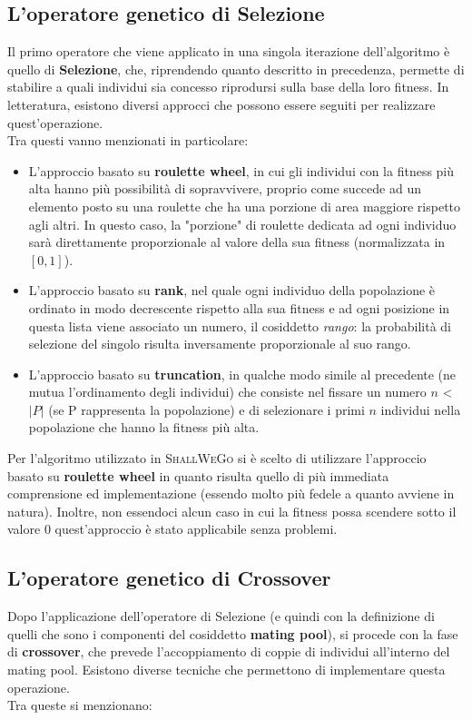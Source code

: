     \subsection{L'operatore genetico di Selezione}
        Il primo operatore che viene applicato in una singola iterazione dell'algoritmo è quello di \textbf{Selezione}, che, riprendendo quanto descritto in precedenza, permette di stabilire a quali individui sia concesso riprodursi sulla base della loro fitness. In letteratura, esistono diversi approcci che possono essere seguiti per realizzare quest'operazione. \\
        Tra questi vanno menzionati in particolare:

        \begin{itemize}
            \item L'approccio basato su \textbf{roulette wheel}, in cui gli individui con la fitness più alta hanno più possibilità di sopravvivere, proprio come succede ad un elemento posto su una roulette che ha una porzione di area maggiore rispetto agli altri. In questo caso, la "porzione" di roulette dedicata ad ogni individuo sarà direttamente proporzionale al valore della sua fitness (normalizzata in $[0, 1]$).
            \item L'approccio basato su \textbf{rank}, nel quale ogni individuo della popolazione è ordinato in modo decrescente rispetto alla sua fitness e ad ogni posizione in questa lista viene associato un numero, il cosiddetto \textit{rango}: la probabilità di selezione del singolo risulta inversamente proporzionale al suo rango.
            \item L'approccio basato su \textbf{truncation}, in qualche modo simile al precedente (ne mutua l'ordinamento degli individui) che consiste nel fissare un numero $n$ < $|P|$ (se P rappresenta la popolazione) e di selezionare i primi $n$ individui nella popolazione che hanno la fitness più alta.
        \end{itemize}

        Per l'algoritmo utilizzato in \textsc{ShallWeGo} si è scelto di utilizzare l'approccio basato su \textbf{roulette wheel} in quanto risulta quello di più immediata comprensione ed implementazione (essendo molto più fedele a quanto avviene in natura). Inoltre, non essendoci alcun caso in cui la fitness possa scendere sotto il valore $0$ quest'approccio è stato applicabile senza problemi.

    \subsection{L'operatore genetico di Crossover}
        Dopo l'applicazione dell'operatore di Selezione (e quindi con la definizione di quelli che sono i componenti del cosiddetto \textbf{mating pool}), si procede con la fase di \textbf{crossover}, che prevede l'accoppiamento di coppie di individui all'interno del mating pool. 
        Esistono diverse tecniche che permettono di implementare questa operazione. \\
        Tra queste si menzionano:

